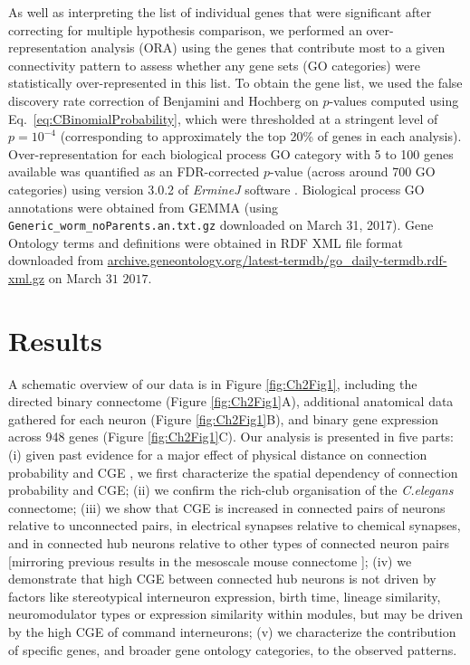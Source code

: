 As well as interpreting the list of individual genes that were significant after correcting for multiple hypothesis comparison, we performed an over-representation analysis (ORA) using the genes that contribute most to a given connectivity pattern to assess whether any gene sets (GO categories) were statistically over-represented in this list.
To obtain the gene list, we used the false discovery rate correction of Benjamini and Hochberg \citep{Benjamini1995} on $p$-values computed using Eq.~\eqref{eq:CBinomialProbability}, which were thresholded at a stringent level of $p = 10^{-4}$ (corresponding to approximately the top 20\% of genes in each analysis).
Over-representation for each biological process GO category with 5 to 100 genes available was quantified as an \mbox{FDR-corrected} $p$-value (across around 700 GO categories) using version 3.0.2 of \emph{ErmineJ} software \citep{Gillis2010}.
Biological process GO annotations \citep{Ashburner2000} were obtained from GEMMA \mbox{\citep{Zoubarev2012}} (using \texttt{Generic\_worm\_noParents.an.txt.gz} downloaded on March 31, 2017).
Gene Ontology terms and definitions were obtained in RDF XML file format downloaded from \mbox{\url{archive.geneontology.org/latest-termdb/go_daily-termdb.rdf-xml.gz}} on March $31$ $2017$.

\section{Results}

A schematic overview of our data is in Figure \ref{fig:Ch2Fig1}, including
the directed binary connectome (Figure \ref{fig:Ch2Fig1}A),
additional anatomical data gathered for each neuron (Figure \ref{fig:Ch2Fig1}B),
and binary gene expression across 948 genes (Figure \ref{fig:Ch2Fig1}C).
Our analysis is presented in five parts:
(i) given past evidence for a major effect of physical distance on connection probability and CGE  \citep{Fulcher2016}, we first characterize the spatial dependency of connection probability and CGE;
(ii) we confirm the rich-club organisation of the \emph{C.elegans} connectome;
(iii) we show that CGE is increased in connected pairs of neurons relative to unconnected pairs, in electrical synapses relative to chemical synapses, and in connected hub neurons relative to other types of connected neuron pairs [mirroring previous results in the mesoscale mouse connectome \citep{Fulcher2016}];
(iv) we demonstrate that high CGE between connected hub neurons is not driven by factors like stereotypical interneuron expression, birth time, lineage similarity, neuromodulator types or expression similarity within modules, but may be driven by the high CGE of command interneurons;
(v) we characterize the contribution of specific genes, and broader gene ontology categories, to the observed patterns.


